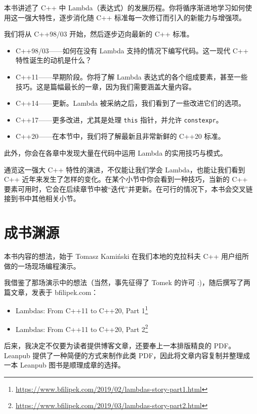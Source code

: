 本书讲述了 C++ 中 Lambda（表达式）的发展历程。你将循序渐进地学习如何使用这一强大特性，逐步消化随 C++ 标准每一次修订而引入的新能力与增强项。

我们将从 C++98/03 开始，然后逐步迈向最新的 C++ 标准。

\begin{itemize}
\item C++98/03——如何在没有 Lambda 支持的情况下编写代码。这一现代 C++ 特性诞生的动机是什么？
\item C++11——早期阶段。你将了解 Lambda 表达式的各个组成要素，甚至一些技巧。这是篇幅最长的一章，因为我们需要涵盖大量内容。
\item C++14——更新。Lambda 被采纳之后，我们看到了一些改进它们的选项。
\item C++17——更多改进，尤其是处理 \texttt{this} 指针，并允许 \texttt{constexpr}。
\item C++20——在本节中，我们将了解最新且非常新鲜的 C++20 标准。
\end{itemize}

此外，你会在各章中发现大量在代码中运用 Lambda 的实用技巧与模式。

通览这一强大 C++ 特性的演进，不仅能让我们学会 Lambda，也能让我们看到 C++ 近年来发生了怎样的变化。在某个小节中你会看到一种技巧，当新的 C++ 要素可用时，它会在后续章节中被“迭代”并更新。在可行的情况下，本书会交叉链接到书中其他相关小节。

\section{成书渊源}

本书内容的想法，始于 Tomasz Kamiński 在我们本地的克拉科夫 C++ 用户组所做的一场现场编程演示。

我借鉴了那场演示中的想法（当然，事先征得了 Tomek 的许可 :)，随后撰写了两篇文章，发表于 bfilipek.com：

\begin{itemize}
\item Lambdas: From C++11 to C++20, Part 1\footnote{\url{https://www.bfilipek.com/2019/02/lambdas-story-part1.html}}
\item Lambdas: From C++11 to C++20, Part 2\footnote{\url{https://www.bfilipek.com/2019/03/lambdas-story-part2.html}}
\end{itemize}

后来，我决定不仅要为读者提供博客文章，还要奉上一本排版精良的 PDF。Leanpub 提供了一种简便的方式来制作此类 PDF，因此将文章内容复制并整理成一本 Leanpub 图书是顺理成章的选择。

